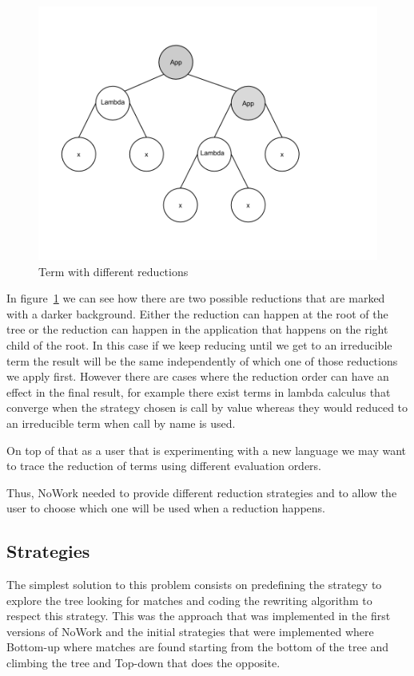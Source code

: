 \documentclass[12pt,a4paper]{article}
\begin{document}
\begin{figure}[!h]
\includegraphics[scale=0.4]{multiple-reductions.png}

\caption{Term with different reductions}
\label{multiple-reductions}
\end{figure}

In figure~\ref{multiple-reductions} we can see how there are two possible reductions that are marked with
a darker background. Either the reduction can happen at the root of
the tree or the reduction can happen in the application that happens
on the right child of the root. In this case if we keep
reducing until we get to an irreducible term the result will be the
same independently of which one of those reductions we apply
first. However there are cases where the reduction order can have an
effect in the final result, for example there exist terms in lambda
calculus that converge when the strategy chosen is call by value
whereas they would reduced to an irreducible term when call by name is
used. 

On top of that as a user that is experimenting with a new language we
may want to trace the reduction of terms using different evaluation
orders.

Thus, NoWork needed to provide different reduction strategies and to
allow the user to choose which one will be used when a reduction happens.

\subsection{Strategies}

The simplest solution to this problem consists on predefining the
strategy to explore the tree looking for matches and coding the
rewriting algorithm to respect this strategy. This was the approach
that was implemented in the first versions of NoWork and the initial
strategies that were implemented where Bottom-up where matches are
found starting from the bottom of the tree and climbing the tree and
Top-down that does the opposite.
\end{document}
